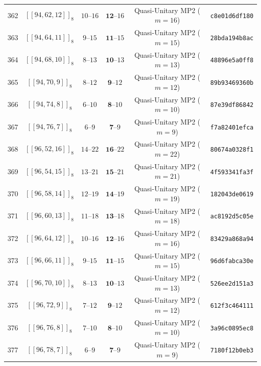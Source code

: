 \documentclass[11pt,a4paper]{article}
\theoremstyle{remark}
\begin{document}
{\begin{longtable}{@{}rccccl@{}}
362 & $[[94,62,12]]_{8}$ & $10\text{--}16$ & $\mathbf{12}\text{--}16$ & Quasi-Unitary MP2 ($m=16$) & \texttt{c8e01d6df180} \\
363 & $[[94,64,11]]_{8}$ & $9\text{--}15$ & $\mathbf{11}\text{--}15$ & Quasi-Unitary MP2 ($m=15$) & \texttt{28bda194b8ac} \\
364 & $[[94,68,10]]_{8}$ & $8\text{--}13$ & $\mathbf{10}\text{--}13$ & Quasi-Unitary MP2 ($m=13$) & \texttt{48896e5a0ff8} \\
365 & $[[94,70,9]]_{8}$ & $8\text{--}12$ & $\mathbf{9}\text{--}12$ & Quasi-Unitary MP2 ($m=12$) & \texttt{89b93469360b} \\
366 & $[[94,74,8]]_{8}$ & $6\text{--}10$ & $\mathbf{8}\text{--}10$ & Quasi-Unitary MP2 ($m=10$) & \texttt{87e39df86842} \\
367 & $[[94,76,7]]_{8}$ & $6\text{--}9$ & $\mathbf{7}\text{--}9$ & Quasi-Unitary MP2 ($m=9$) & \texttt{f7a82401efca} \\
368 & $[[96,52,16]]_{8}$ & $14\text{--}22$ & $\mathbf{16}\text{--}22$ & Quasi-Unitary MP2 ($m=22$) & \texttt{80674a0328f1} \\
369 & $[[96,54,15]]_{8}$ & $13\text{--}21$ & $\mathbf{15}\text{--}21$ & Quasi-Unitary MP2 ($m=21$) & \texttt{4f593341fa3f} \\
370 & $[[96,58,14]]_{8}$ & $12\text{--}19$ & $\mathbf{14}\text{--}19$ & Quasi-Unitary MP2 ($m=19$) & \texttt{182043de0619} \\
371 & $[[96,60,13]]_{8}$ & $11\text{--}18$ & $\mathbf{13}\text{--}18$ & Quasi-Unitary MP2 ($m=18$) & \texttt{ac8192d5c05e} \\
372 & $[[96,64,12]]_{8}$ & $10\text{--}16$ & $\mathbf{12}\text{--}16$ & Quasi-Unitary MP2 ($m=16$) & \texttt{83429a868a94} \\
373 & $[[96,66,11]]_{8}$ & $9\text{--}15$ & $\mathbf{11}\text{--}15$ & Quasi-Unitary MP2 ($m=15$) & \texttt{96d6fabca30e} \\
374 & $[[96,70,10]]_{8}$ & $8\text{--}13$ & $\mathbf{10}\text{--}13$ & Quasi-Unitary MP2 ($m=13$) & \texttt{526ee2d151a3} \\
375 & $[[96,72,9]]_{8}$ & $7\text{--}12$ & $\mathbf{9}\text{--}12$ & Quasi-Unitary MP2 ($m=12$) & \texttt{612f3c464111} \\
376 & $[[96,76,8]]_{8}$ & $7\text{--}10$ & $\mathbf{8}\text{--}10$ & Quasi-Unitary MP2 ($m=10$) & \texttt{3a96c0895ec8} \\
377 & $[[96,78,7]]_{8}$ & $6\text{--}9$ & $\mathbf{7}\text{--}9$ & Quasi-Unitary MP2 ($m=9$) & \texttt{7180f12b0eb3} \\

\end{longtable}}
\end{document}
